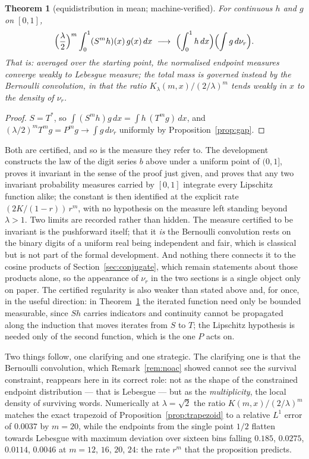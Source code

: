 \documentclass[11pt,reqno]{amsart}
\theoremstyle{plain}
\newtheorem{theorem}{Theorem}
\theoremstyle{definition}
\theoremstyle{remark}
\begin{document}
\begin{theorem}[equidistribution in mean; machine-verified]\label{thm:equimean}
For continuous $h$ and $g$ on $[0,1]$,
\[
  \Bigl(\frac\lambda2\Bigr)^{m}\int_0^1(S^mh)(x)\,g(x)\,dx
  \ \longrightarrow\ \Bigl(\int_0^1h\,dx\Bigr)\Bigl(\int g\,d\nu_r\Bigr).
\]
That is: averaged over the starting point, the normalised endpoint measures
converge weakly to \emph{Lebesgue} measure; the total mass is governed
instead by the \emph{Bernoulli convolution}, in that the ratio
$K_\lambda(m,x)/(2/\lambda)^m$ tends weakly in $x$ to the density of
$\nu_r$.
\end{theorem}

\begin{proof}
$S=T^*$, so $\int(S^mh)g\,dx=\int h\,(T^mg)\,dx$, and
$(\lambda/2)^mT^mg=P^mg\to\int g\,d\nu_r$ uniformly by
Proposition~\ref{prop:gap}.
\end{proof}

Both are certified, and so is the measure they refer to. The development
constructs the law of the digit series $b$ above under a uniform point of
$(0,1]$, proves it invariant in the sense of the proof just given, and proves
that any two invariant probability measures carried by $[0,1]$ integrate every
Lipschitz function alike; the constant is then identified at the explicit rate
$(2K/(1-r))\,r^m$, with no hypothesis on the measure left standing beyond
$\lambda>1$. Two limits are recorded rather than hidden. The measure certified
to be invariant is the pushforward itself; that it \emph{is} the Bernoulli
convolution rests on the binary digits of a uniform real being independent and
fair, which is classical but is not part of the formal development. And nothing
there connects it to the cosine products of Section~\ref{sec:conjugate}, which
remain statements about those products alone, so the appearance of $\nu_r$ in
the two sections is a single object only on paper. The certified regularity is also weaker than stated above and, for
once, in the useful direction: in Theorem~\ref{thm:equimean} the iterated
function need only be bounded measurable, since $Sh$ carries indicators and
continuity cannot be propagated along the induction that moves iterates from
$S$ to $T$; the Lipschitz hypothesis is needed only of the second function,
which is the one $P$ acts on.

Two things follow, one clarifying and one strategic. The clarifying one is that
the Bernoulli convolution, which Remark~\ref{rem:noac} showed cannot see the
survival constraint, reappears here in its correct role: not as the shape of
the constrained endpoint distribution --- that is Lebesgue --- but as the
\emph{multiplicity}, the local density of surviving words. Numerically at
$\lambda=\sqrt2$ the ratio $K(m,x)/(2/\lambda)^m$ matches the exact trapezoid
of Proposition~\ref{prop:trapezoid} to a relative $L^1$ error of $0.0037$ by
$m=20$, while the endpoints from the single point $1/2$ flatten towards
Lebesgue with maximum deviation over sixteen bins falling
$0.185$, $0.0275$, $0.0114$, $0.0046$ at $m=12$, $16$, $20$, $24$: the rate
$r^m$ that the proposition predicts.
\end{document}
